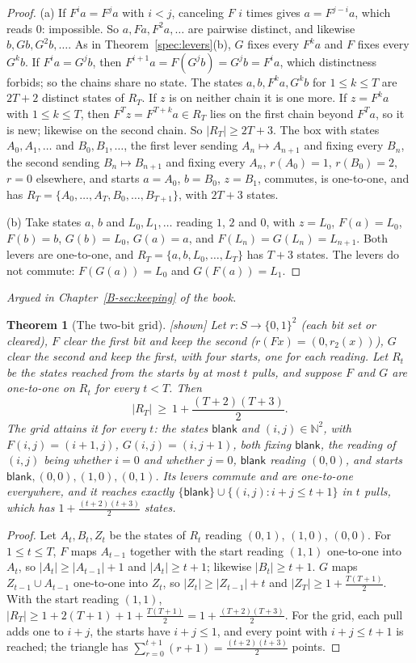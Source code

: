 \documentclass[11pt, a4paper]{article}
\theoremstyle{plain}
\newtheorem{theorem}{Theorem}[section]
\theoremstyle{definition}
\theoremstyle{remark}
\newcommand{\N}{\mathbb{N}}
\newcommand{\rd}{r}
\newcommand{\argued}[1]{\par\noindent\textit{Argued in Chapter~\ref{B-#1} of the book.}\par}
\newcommand{\kind}[1]{\textup{[#1]}}
\begin{document}
\begin{proof}
(a) If $F^ia=F^ja$ with $i<j$, canceling $F$ $i$ times gives $a=F^{j-i}a$, which reads $0$: impossible. So
$a,Fa,F^2a,\dots$ are pairwise distinct, and likewise $b,Gb,G^2b,\dots$. As in Theorem~\ref{spec:levers}(b),
$G$ fixes every $F^ka$ and $F$ fixes every $G^kb$. If $F^ia=G^jb$, then $F^{i+1}a=F(G^jb)=G^jb=F^ia$, which
distinctness forbids; so the chains share no state. The states $a,b,F^ka,G^kb$ for $1\le k\le T$ are $2T+2$
distinct states of $R_T$. If $z$ is on neither chain it is one more. If $z=F^ka$ with $1\le k\le T$, then
$F^T z=F^{T+k}a\in R_T$ lies on the first chain beyond $F^Ta$, so it is new; likewise on the second chain. So
$|R_T|\ge2T+3$. The box with states $A_0,A_1,\dots$ and $B_0,B_1,\dots$, the first lever sending
$A_n\mapsto A_{n+1}$ and fixing every $B_n$, the second sending $B_n\mapsto B_{n+1}$ and fixing every $A_n$,
$\rd(A_0)=1$, $\rd(B_0)=2$, $\rd=0$ elsewhere, and starts $a=A_0$, $b=B_0$, $z=B_1$, commutes, is one-to-one,
and has $R_T=\{A_0,\dots,A_T,B_0,\dots,B_{T+1}\}$, with $2T+3$ states.

(b) Take states $a$, $b$ and $L_0,L_1,\dots$ reading $1$, $2$ and $0$, with $z=L_0$, $F(a)=L_0$, $F(b)=b$,
$G(b)=L_0$, $G(a)=a$, and $F(L_n)=G(L_n)=L_{n+1}$. Both levers are one-to-one, and
$R_T=\{a,b,L_0,\dots,L_T\}$ has $T+3$ states. The levers do not commute: $F(G(a))=L_0$ and $G(F(a))=L_1$.
\end{proof}
\argued{sec:keeping}

\begin{theorem}[The two-bit grid]\label{spec:grid} \kind{shown}
Let $\rd:S\to\{0,1\}^2$ (each bit set or cleared), $F$ clear the first bit and keep the second
($\rd(F x)=(0,\rd_2(x))$), $G$ clear the second and keep the first, with four starts, one for each reading.
Let $R_t$ be the states reached from the starts by at most $t$ pulls, and suppose $F$ and $G$ are one-to-one
on $R_{t}$ for every $t<T$. Then
\[
|R_T|\ \ge\ 1+\frac{(T+2)(T+3)}2 .
\]
The grid attains it for every $t$: the states $\mathsf{blank}$ and $(i,j)\in\N^2$, with $F(i,j)=(i+1,j)$,
$G(i,j)=(i,j+1)$, both fixing $\mathsf{blank}$, the reading of $(i,j)$ being whether $i=0$ and whether $j=0$,
$\mathsf{blank}$ reading $(0,0)$, and starts $\mathsf{blank},(0,0),(1,0),(0,1)$. Its levers commute and are
one-to-one everywhere, and it reaches exactly $\{\mathsf{blank}\}\cup\{(i,j):i+j\le t+1\}$ in $t$ pulls, which
has $1+\frac{(t+2)(t+3)}2$ states.
\end{theorem}

\begin{proof}
Let $A_t,B_t,Z_t$ be the states of $R_t$ reading $(0,1)$, $(1,0)$, $(0,0)$. For $1\le t\le T$, $F$ maps
$A_{t-1}$ together with the start reading $(1,1)$ one-to-one into $A_t$, so $|A_t|\ge|A_{t-1}|+1$ and
$|A_t|\ge t+1$; likewise $|B_t|\ge t+1$. $G$ maps $Z_{t-1}\cup A_{t-1}$ one-to-one into $Z_t$, so
$|Z_t|\ge|Z_{t-1}|+t$ and $|Z_T|\ge1+\frac{T(T+1)}2$. With the start reading $(1,1)$,
$|R_T|\ge1+2(T+1)+1+\frac{T(T+1)}2=1+\frac{(T+2)(T+3)}2$. For the grid, each pull adds one to $i+j$, the
starts have $i+j\le1$, and every point with $i+j\le t+1$ is reached; the triangle has
$\sum_{r=0}^{t+1}(r+1)=\frac{(t+2)(t+3)}2$ points.
\end{proof}
\end{document}
